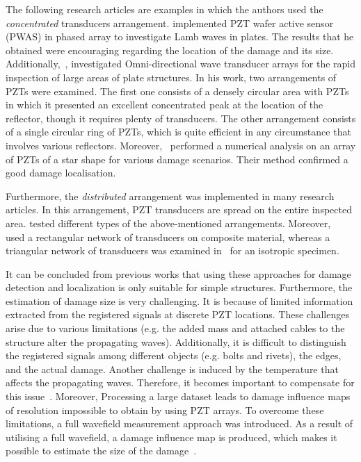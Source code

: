 The following research articles are examples in which the authors used the \emph{concentrated} transducers arrangement.
\textcite{Giurgiutiu2006} implemented PZT wafer active sensor (PWAS) in phased array to investigate Lamb waves in plates.
The results that he obtained were encouraging regarding the location of the damage and its size.
Additionally,~\textcite{Wilcox2003}, investigated Omni-directional wave transducer arrays for the rapid inspection of large areas of plate structures. 
In his work, two arrangements of PZTs were examined. 
The first one consists of a densely circular area with PZTs in which it presented an excellent concentrated peak at the location of the reflector, though it requires plenty of transducers. 
The other arrangement consists of a single circular ring of PZTs, which is quite efficient in any circumstance that involves various reflectors.
Moreover,~\textcite{Malinowski2009} performed a numerical analysis on an array of PZTs of a star shape for various damage scenarios. 
Their method confirmed a good damage localisation.

Furthermore, the \emph{distributed} arrangement was implemented in many research articles. 
In this arrangement, PZT transducers are spread on the entire inspected area.
\textcite{Schubert2008} tested different types of the above-mentioned arrangements. 
Moreover,~\textcite{Qiang2009} used a rectangular network of transducers on composite material, whereas a triangular network of transducers was examined in~\cite{Wandowski2009} for an isotropic specimen.

It can be concluded from previous works that using these approaches for damage detection and localization is only suitable for simple structures. 
Furthermore, the estimation of damage size is very challenging.
It is because of limited information extracted from the registered signals at discrete PZT locations. 
These challenges arise due to various limitations (e.g. the added mass and attached cables to the structure alter the propagating waves). 
Additionally, it is difficult to distinguish the registered signals among different objects (e.g. bolts and rivets), the edges, and the actual damage. 
Another challenge is induced by the temperature that affects the propagating waves. 
Therefore, it becomes important to compensate for this issue~\cite{Marzani1999}.
Moreover, Processing a large dataset leads to damage influence maps of resolution impossible to obtain by using PZT arrays.
To overcome these limitations, a full wavefield measurement approach was introduced. 
As a result of utilising a full wavefield, a damage influence map is produced, which makes it possible to estimate the size of the damage~\cite{Ostachowicz2014}.
